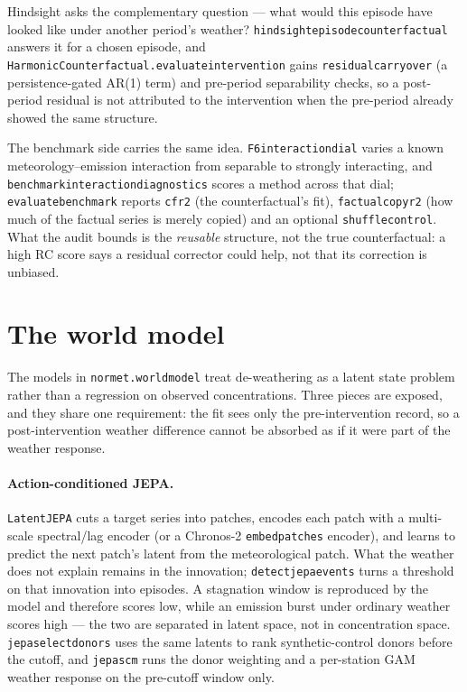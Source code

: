 \documentclass[11pt]{report}
\newcommand{\codeunderscore}{\textunderscore\allowbreak}
\newcommand{\code}[1]{\texttt{\let\_\codeunderscore #1}}
\begin{document}
Hindsight asks the complementary question --- what would this episode have looked like
under another period's weather? \code{hindsight\_episode\_counterfactual} answers it for
a chosen episode, and \code{HarmonicCounterfactual.evaluate\_intervention} gains
\code{residual\_carryover} (a persistence-gated AR(1) term) and pre-period separability
checks, so a post-period residual is not attributed to the intervention when the
pre-period already showed the same structure.

The benchmark side carries the same idea. \code{F6\_interaction\_dial} varies a known
meteorology--emission interaction from separable to strongly interacting, and
\code{benchmark\_interaction\_diagnostics} scores a method across that dial;
\code{evaluate\_benchmark} reports \code{cf\_r2} (the counterfactual's fit),
\code{factual\_copy\_r2} (how much of the factual series is merely copied) and an
optional \code{shuffle\_control}. What the audit bounds is the \emph{reusable} structure,
not the true counterfactual: a high RC score says a residual corrector could help, not
that its correction is unbiased.

\section{The world model}\label{sec:worldmodeltheory}
The models in \code{normet.world\_model} treat de-weathering as a latent state
problem rather than a regression on observed concentrations. Three pieces are
exposed, and they share one requirement: the fit sees only the pre-intervention
record, so a post-intervention weather difference cannot be absorbed as if it
were part of the weather response.

\paragraph{Action-conditioned JEPA.} \code{LatentJEPA} cuts a target series
into patches, encodes each patch with a multi-scale spectral/lag encoder (or a
Chronos-2 \code{embed\_patches} encoder), and learns to predict the next patch's
latent from the meteorological patch. What the weather does not explain remains
in the innovation; \code{detect\_jepa\_events} turns a threshold on that
innovation into episodes. A stagnation window is reproduced by the model and
therefore scores low, while an emission burst under ordinary weather scores
high --- the two are separated in latent space, not in concentration space.
\code{jepa\_select\_donors} uses the same latents to rank synthetic-control
donors before the cutoff, and \code{jepa\_scm} runs the donor weighting and a
per-station GAM weather response on the pre-cutoff window only.
\end{document}
